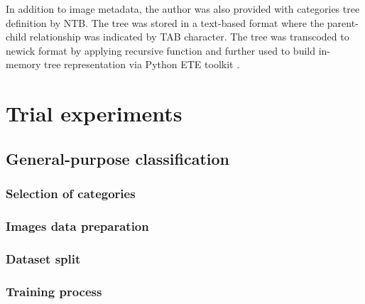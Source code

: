 In addition to image metadata, the author was also provided with categories tree definition by NTB. The tree was stored in a text-based format where the parent-child relationship was indicated by TAB character. The tree was transcoded to newick \cite{newick} format by applying recursive function and further used to build in-memory tree representation via Python ETE toolkit \cite{ete3}.


\section{Trial experiments}
    \subsection{General-purpose classification}
    \subsubsection{Selection of categories}
    \subsubsection{Images data preparation}
    \subsubsection{Dataset split}
    \subsubsection{Training process}
    
    
    
